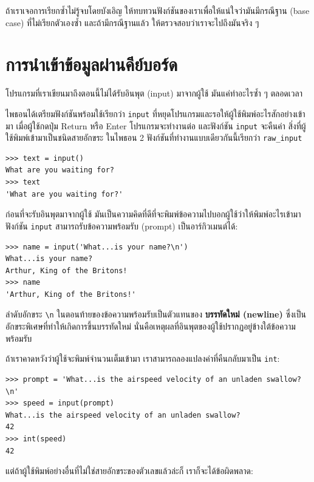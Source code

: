 ถ้าเราเจอการเรียกซ้ำไม่รู้จบโดยบังเอิญ ให้ทบทวนฟังก์ชันของเราเพื่อให้แน่ใจว่ามันมีกรณีฐาน 
(base case) ที่ไม่เรียกตัวเองซ้ำ และถ้ามีกรณีฐานแล้ว ให้ตรวจสอบว่าเราจะไปถึงมันจริง ๆ


\section{การนำเข้าข้อมูลผ่านคีย์บอร์ด}%

โปรแกรมที่เราเขียนมาถึงตอนนี้ไม่ได้รับอินพุต (input) มาจากผู้ใช้
มันแค่ทำอะไรซ้ำ ๆ ตลอดเวลา

ไพธอนได้เตรียมฟังก์ชันพร้อมใช้เรียกว่า {\tt input} ที่หยุดโปรแกรมและรอให้ผู้ใช้พิมพ์อะไรสักอย่างเข้ามา
เมื่อผู้ใช้กดปุ่ม {\sf Return} หรือ {\sf Enter} โปรแกรมจะทำงานต่อ และฟังก์ชัน \verb"input" จะคืนค่า
สิ่งที่ผู้ใช้พิมพ์เข้ามาเป็นชนิดสายอักขระ  ในไพธอน 2 ฟังก์ชันที่ทำงานแบบเดียวกันนี้เรียกว่า \verb"raw_input"

\begin{verbatim}
>>> text = input()
What are you waiting for?
>>> text
'What are you waiting for?'
\end{verbatim}
%
ก่อนที่จะรับอินพุตมาจากผู้ใช้ มันเป็นความคิดที่ดีที่จะพิมพ์ข้อความไปบอกผู้ใช้ว่าให้พิมพ์อะไรเข้ามา 
ฟังก์ชัน \verb"input" สามารถรับข้อความพร้อมรับ (prompt) เป็นอาร์กิวเมนต์ได้:

\begin{verbatim}
>>> name = input('What...is your name?\n')
What...is your name?
Arthur, King of the Britons!
>>> name
'Arthur, King of the Britons!'
\end{verbatim}
%
ลำดับอักขระ \verb"\n" ในตอนท้ายของข้อความพร้อมรับเป็นตัวแทนของ {\bf บรรทัดใหม่ (newline)}
ซึ่งเป็นอักขระพิเศษที่ทำให้เกิดการขึ้นบรรทัดใหม่ นั่นคือเหตุผลที่อินพุตของผู้ใช้ปรากฏอยู่ข้างใต้ข้อความพร้อมรับ

ถ้าเราคาดหวังว่าผู้ใช้จะพิมพ์จำนวนเต็มเข้ามา เราสามารถลองแปลงค่าที่คืนกลับมาเป็น {\tt int}:

\begin{verbatim}
>>> prompt = 'What...is the airspeed velocity of an unladen swallow?\n'
>>> speed = input(prompt)
What...is the airspeed velocity of an unladen swallow?
42
>>> int(speed)
42
\end{verbatim}
%
แต่ถ้าผู้ใช้พิมพ์อย่างอื่นที่ไม่ใช่สายอักขระของตัวเลขแล้วล่ะก็ เราก็จะได้ข้อผิดพลาด:

